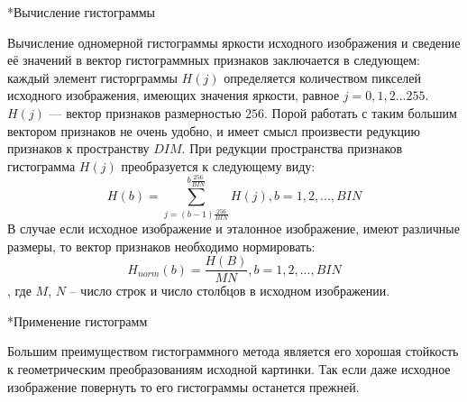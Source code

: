 \documentclass[a4paper,12pt,titlpage]{posobie}
\makeatletter
\renewcommand{\subsection}{\@startsection{subsection}{2}{0.0cm}{0.3cm}{0.1cm}%
             {\fontsize{14}{16}\bf\selectfont }}
\makeatother
\begin{document}
\subsection*{Вычисление гистограммы}

    Вычисление одномерной гистограммы яркости исходного изображения и сведение её значений в вектор гистограммных признаков заключается 
в следующем: каждый элемент гисторграммы $H(j)$ определяется количеством пикселей исходного изображения, имеющих значения яркости, равное 
$j=0,1,2 ... 255$. $H(j)$ --- вектор признаков размерностью $256$. Порой работать с таким большим вектором признаков не очень удобно, и имеет 
смысл произвести редукцию признаков к пространству $DIM$. При редукции пространства признаков гистограмма $H(j)$ 
преобразуется к следующему виду:
\[ H(b) = \sum_{j=(b-1)\frac{256}{BIN}}^{b\frac{256}{BIN}} H(j), b = 1,2,...,BIN \]
В случае если исходное изображение и эталонное изображение, имеют различные размеры, то вектор признаков необходимо нормировать:
\[ H_{norm}(b) = \frac{H(B)}{MN}, b = 1,2,..., BIN \],
где $M$, $N$ -- число строк и число столбцов в исходном изображении.

\subsection*{Применение гистограмм}
     
     Большим преимуществом гистограммного метода является его хорошая стойкость к геометрическим преобразованиям исходной 
картинки. Так если даже исходное изображение повернуть то его гистограммы останется прежней. 
\end{document}
